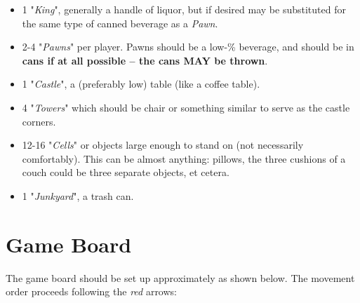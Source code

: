 \documentclass[12pt]{article}
\begin{document}
\begin{itemize}
    \item 1 "\textit{King}", generally a handle of liquor, but if desired may be substituted for the same type of canned beverage as a \textit{Pawn}.
    \item 2-4 "\textit{Pawns}" per player. Pawns should be a low-\% beverage, and should be in \textbf{cans if at all possible -- the cans MAY be thrown}.
    \item 1 "\textit{Castle}", a (preferably low) table (like a coffee table).
    \item 4 "\textit{Towers}" which should be chair or something similar to serve as the castle corners.
    \item 12-16 "\textit{Cells}" or objects large enough to stand on (not necessarily comfortably). This can be almost anything: pillows, the three cushions of a couch could be three separate objects, et cetera.
    \item 1 "\textit{Junkyard}", a trash can.
\end{itemize}

\pagebreak

\section{Game Board} \label{board}

The game board should be set up approximately as shown below. The movement order proceeds following the \textit{red} arrows: \\
\end{document}
